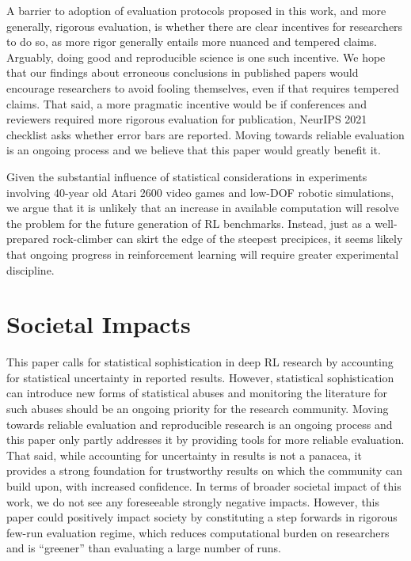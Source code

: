 A barrier to adoption of evaluation protocols proposed in this work, and more generally, rigorous evaluation, is whether there are clear incentives for researchers to do so, as more rigor generally entails more nuanced and tempered claims. Arguably, doing good and reproducible science is one such incentive. We hope that our findings about erroneous conclusions in published papers would encourage researchers to avoid fooling themselves, even if that requires tempered claims. That said, a more pragmatic incentive would be if conferences and reviewers required more rigorous evaluation for publication, \eg NeurIPS 2021 checklist asks whether error bars are reported. Moving towards reliable evaluation is an ongoing process and we believe that this paper would greatly benefit it.


Given the substantial influence of statistical considerations in experiments involving 40-year old Atari 2600 video games and low-DOF robotic simulations, we argue that it is unlikely that an increase in available computation will resolve the problem for the future generation of RL benchmarks. Instead, just as a well-prepared rock-climber can skirt the edge of the steepest precipices, it seems likely that ongoing progress in reinforcement learning will require greater experimental discipline.


\section*{Societal Impacts}
\vspace{-0.1cm}
This paper calls for statistical sophistication in deep RL research by accounting for statistical uncertainty in reported results. However, statistical sophistication can introduce new forms of statistical abuses and monitoring the literature for such abuses should be an ongoing priority for the research community.
Moving towards reliable evaluation and reproducible research is an ongoing process and this paper only partly addresses it by providing tools for more reliable evaluation. That said, while accounting for uncertainty in results is not a panacea, it provides a strong foundation for trustworthy results on which the community can build upon, with increased confidence. In terms of broader societal impact of this work, we do not see any foreseeable strongly negative impacts. However, this paper could positively impact society by constituting a step forwards in rigorous few-run evaluation regime, which reduces computational burden on researchers and is ``greener'' than evaluating a large number of runs. 

